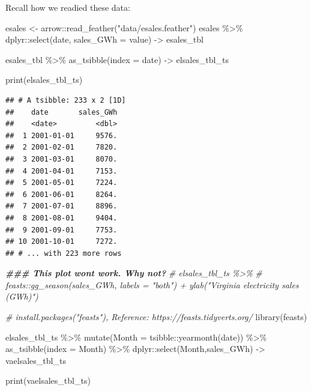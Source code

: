 \documentclass[
]{book}
\newenvironment{Shaded}{\begin{snugshade}}{\end{snugshade}}
\newcommand{\AttributeTok}[1]{\textcolor[rgb]{0.77,0.63,0.00}{#1}}
\newcommand{\CommentTok}[1]{\textcolor[rgb]{0.56,0.35,0.01}{\textit{#1}}}
\newcommand{\DocumentationTok}[1]{\textcolor[rgb]{0.56,0.35,0.01}{\textbf{\textit{#1}}}}
\newcommand{\FunctionTok}[1]{\textcolor[rgb]{0.00,0.00,0.00}{#1}}
\newcommand{\NormalTok}[1]{#1}
\newcommand{\OtherTok}[1]{\textcolor[rgb]{0.56,0.35,0.01}{#1}}
\newcommand{\SpecialCharTok}[1]{\textcolor[rgb]{0.00,0.00,0.00}{#1}}
\newcommand{\StringTok}[1]{\textcolor[rgb]{0.31,0.60,0.02}{#1}}
\begin{document}
Recall how we readied these data:

\begin{Shaded}
\begin{Highlighting}[]
\NormalTok{esales }\OtherTok{\textless{}{-}}\NormalTok{ arrow}\SpecialCharTok{::}\FunctionTok{read\_feather}\NormalTok{(}\StringTok{"data/esales.feather"}\NormalTok{)}
\NormalTok{esales }\SpecialCharTok{\%\textgreater{}\%}
\NormalTok{  dplyr}\SpecialCharTok{::}\FunctionTok{select}\NormalTok{(date, }\AttributeTok{sales\_GWh =}\NormalTok{ value) }\OtherTok{{-}\textgreater{}}\NormalTok{ esales\_tbl}

\NormalTok{esales\_tbl }\SpecialCharTok{\%\textgreater{}\%} \FunctionTok{as\_tsibble}\NormalTok{(}\AttributeTok{index =}\NormalTok{ date) }\OtherTok{{-}\textgreater{}}\NormalTok{ elsales\_tbl\_ts}

\FunctionTok{print}\NormalTok{(elsales\_tbl\_ts)}
\end{Highlighting}
\end{Shaded}

\begin{verbatim}
## # A tsibble: 233 x 2 [1D]
##    date       sales_GWh
##    <date>         <dbl>
##  1 2001-01-01     9576.
##  2 2001-02-01     7820.
##  3 2001-03-01     8070.
##  4 2001-04-01     7153.
##  5 2001-05-01     7224.
##  6 2001-06-01     8264.
##  7 2001-07-01     8896.
##  8 2001-08-01     9404.
##  9 2001-09-01     7753.
## 10 2001-10-01     7272.
## # ... with 223 more rows
\end{verbatim}

\begin{Shaded}
\begin{Highlighting}[]
\DocumentationTok{\#\#\# This plot won\textquotesingle{}t work. Why not?}
\CommentTok{\# elsales\_tbl\_ts \%\textgreater{}\%}
\CommentTok{\#   feasts::gg\_season(sales\_GWh, labels = "both") + ylab("Virginia electricity sales (GWh)")}
\end{Highlighting}
\end{Shaded}

\begin{Shaded}
\begin{Highlighting}[]
\CommentTok{\# install.packages("feasts"), Reference: https://feasts.tidyverts.org/}
\FunctionTok{library}\NormalTok{(feasts)}

\NormalTok{elsales\_tbl\_ts }\SpecialCharTok{\%\textgreater{}\%}
  \FunctionTok{mutate}\NormalTok{(}\AttributeTok{Month =}\NormalTok{ tsibble}\SpecialCharTok{::}\FunctionTok{yearmonth}\NormalTok{(date)) }\SpecialCharTok{\%\textgreater{}\%}
  \FunctionTok{as\_tsibble}\NormalTok{(}\AttributeTok{index =}\NormalTok{ Month) }\SpecialCharTok{\%\textgreater{}\%}
\NormalTok{  dplyr}\SpecialCharTok{::}\FunctionTok{select}\NormalTok{(Month,sales\_GWh) }\OtherTok{{-}\textgreater{}}\NormalTok{ vaelsales\_tbl\_ts}

\FunctionTok{print}\NormalTok{(vaelsales\_tbl\_ts)}
\end{Highlighting}
\end{Shaded}
\end{document}

